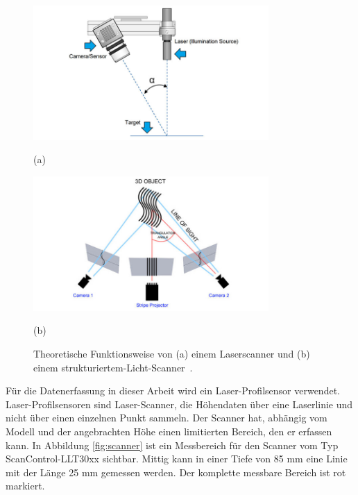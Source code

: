 \begin{figure}[H]
    \centering
    \begin{minipage}{\textwidth}
        \centering
        \includegraphics[width=0.8\textwidth]{images/laser_1.jpg} %
        \caption*{(a)} 
    \end{minipage}\hfill
    \begin{minipage}{\textwidth}
        \centering
        \includegraphics[width=0.8\textwidth]{images/structured_light_1.jpg} %
        \caption*{(b)}
    \end{minipage}\hfill
    \caption{Theoretische Funktionsweise von (a) einem Laserscanner und (b) einem 
    strukturiertem-Licht-Scanner~\cite{V..08.08.2019}.}
        \label{fig:scanning_theo}
\end{figure}

Für die Datenerfassung in dieser Arbeit wird ein Laser-Profilsensor verwendet.
Laser-Profilsensoren sind Laser-Scanner, die Höhendaten über 
eine Laserlinie und nicht über einen einzelnen Punkt sammeln. 
Der Scanner hat, abhängig vom Modell und der angebrachten Höhe einen limitierten
Bereich, den er erfassen kann.
In Abbildung \ref{fig:scanner} ist ein Messbereich für den Scanner vom Typ 
ScanControl-LLT30xx sichtbar. Mittig kann 
in einer Tiefe von 85 mm eine Linie mit der Länge 25 mm gemessen werden. 
Der komplette messbare Bereich ist rot markiert. \cite{MESSTECHNIK_2020}

